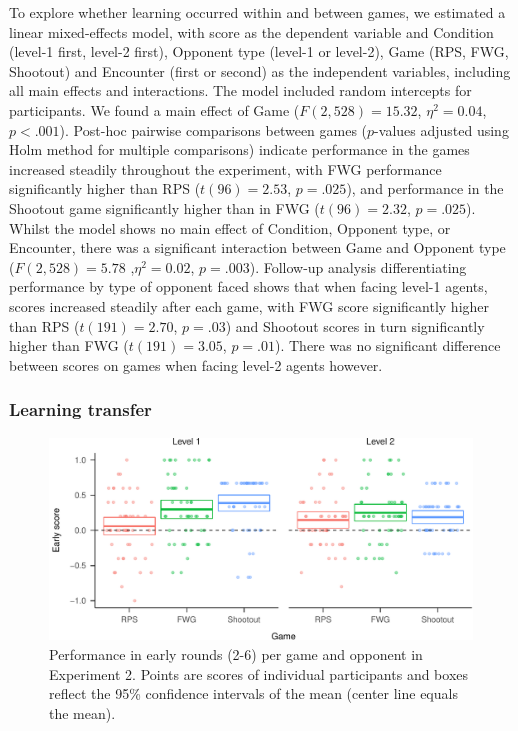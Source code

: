 \documentclass[
  english,
  man,floatsintext]{apa6}
\begin{document}
To explore whether learning occurred within and between games, we estimated a linear mixed-effects model, with score as the dependent variable and Condition (level-1 first, level-2 first), Opponent type (level-1 or level-2), Game (RPS, FWG, Shootout) and Encounter (first or second) as the independent variables, including all main effects and interactions. The model included random intercepts for participants. We found a main effect of Game (\(F(2,528) = 15.32\), \(\eta^{2} = 0.04\), \(p < .001\)). Post-hoc pairwise comparisons between games (\(p\)-values adjusted using Holm method for multiple comparisons) indicate performance in the games increased steadily throughout the experiment, with FWG performance significantly higher than RPS (\(t(96) =2.53\), \(p = .025\)), and performance in the Shootout game significantly higher than in FWG (\(t(96) = 2.32\), \(p = .025\)). Whilst the model shows no main effect of Condition, Opponent type, or Encounter, there was a significant interaction between Game and Opponent type (\(F(2, 528) = 5.78\) ,\(\eta^{2} = 0.02\), \(p = .003\)). Follow-up analysis differentiating performance by type of opponent faced shows that when facing level-1 agents, scores increased steadily after each game, with FWG score significantly higher than RPS (\(t(191) = 2.70\), \(p = .03\)) and Shootout scores in turn significantly higher than FWG (\(t(191) = 3.05\), \(p = .01\)). There was no significant difference between scores on games when facing level-2 agents however.

\hypertarget{learning-transfer-1}{%
\subsubsection{Learning transfer}\label{learning-transfer-1}}

\begin{figure}

{\centering \includegraphics{paper_draft_2021_files/figure-latex/exp2-early-score-by-opp-1} 

}

\caption{\label{ref:figure4-caption}Performance in early rounds (2-6) per game and opponent in Experiment 2. Points are scores of individual participants and boxes reflect the 95\% confidence intervals of the mean (center line equals the mean).}\label{fig:exp2-early-score-by-opp}
\end{figure}
\end{document}
